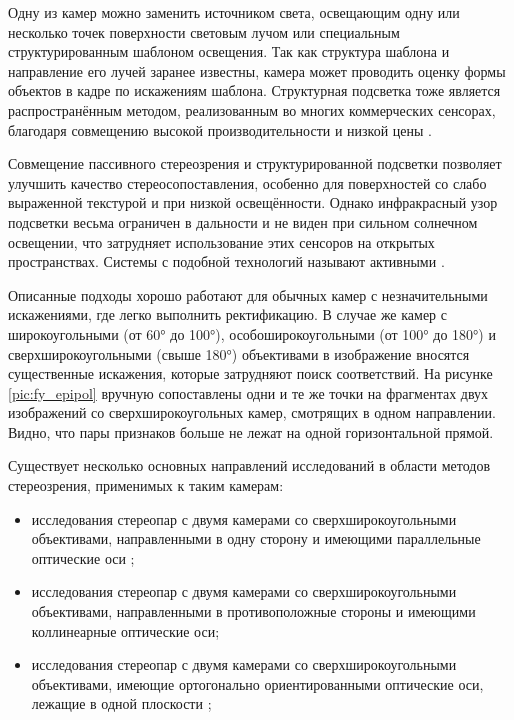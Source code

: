Одну из камер можно заменить источником  света, освещающим одну или несколько точек поверхности световым лучом или специальным структурированным шаблоном освещения.  %
Так как структура шаблона и направление его  лучей заранее известны, камера может проводить оценку формы объектов в кадре по искажениям шаблона\cite{shapiro}. 
Структурная подсветка тоже является распространённым методом, реализованным во многих коммерческих сенсорах, благодаря совмещению высокой производительности 
и  низкой цены \cite{struct_light}.  

Совмещение пассивного стереозрения и структурированной подсветки позволяет улучшить качество стереосопоставления, особенно для поверхностей со слабо выраженной текстурой
и при низкой освещённости. Однако инфракрасный узор подсветки весьма ограничен в дальности и не виден при сильном солнечном освещении, что затрудняет использование этих    %
сенсоров на открытых пространствах. Системы с подобной технологий называют активными \cite{kinect_perf}. 


Описанные подходы хорошо работают для обычных камер с незначительными искажениями, где легко выполнить ректификацию. 		%
В случае  же камер с широкоугольными (от 60° до 100°), особоширокоугольными (от 100° до 180°) и сверхширокоугольными (свыше 180°)  \cite{camera_class} объективами
 в изображение вносятся существенные искажения, которые затрудняют поиск соответствий. На 
рисунке \ref{pic:fy_epipol} вручную сопоставлены одни и те же точки на фрагментах двух изображений со сверхширокоугольных камер,
смотрящих в одном направлении. Видно, что пары признаков больше не лежат на одной горизонтальной прямой.  


Существует несколько основных направлений исследований в области методов стереозрения, применимых к таким камерам:
\begin{itemize}
\item исследования стереопар с двумя камерами со сверхширокоугольными объективами, направленными в одну сторону и имеющими параллельные оптические оси \cite{parallel_fy, sweep_net};
\item исследования стереопар с двумя камерами со сверхширокоугольными объективами, направленными в противоположные стороны и имеющими коллинеарные оптические оси;
\item исследования стереопар с двумя камерами со сверхширокоугольными объективами, имеющие ортогонально ориентированными оптические оси, лежащие в одной плоскости \cite{ortho_fy};
\end{itemize}

